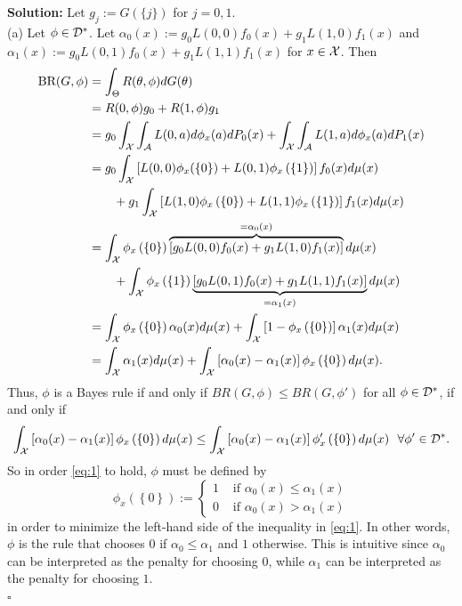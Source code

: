 \documentclass[12pt]{article}
\newcounter{ProofCounter}
\newenvironment{Solution}{\stepcounter{ProofCounter}\textbf{Solution:}}{\hfill$\square$}
\begin{document}
\begin{Solution}
  Let $g_j := G(\{j\})$ for $j = 0,1$. \\

  (a) Let $\phi \in \mathcal{D}^*$. Let $\alpha_0(x) := g_0L(0,0)f_0(x) + g_1L(1,0)f_1(x)$ and $\alpha_1(x) := g_0L(0,1)f_0(x) + g_1L(1,1)f_1(x)$
  for $x \in \mathcal{X}$.
  Then 
  \begin{align*}
    \text{BR}(G,\phi) & = \int_{\Theta}R(\theta, \phi)dG(\theta) \\
    & = R(0,\phi) g_0 + R(1,\phi)g_1 \\
    & = g_0 \int_{\mathcal{X}}\int_{\mathcal{A}}L(0,a)d\phi_x(a)dP_0(x) + \int_{\mathcal{X}}\int_{\mathcal{A}}L(1,a)d\phi_x(a)dP_1(x) \\
    & = g_0 \int_{\mathcal{X}}\left[ L(0,0)\phi_x(\left\{ 0 \right\}) + L(0,1)\phi_x\left( \left\{ 1 \right\} \right) \right]f_0(x)d\mu(x) \\
    & \qquad + 
    g_1\int_{\mathcal{X}}\left[ L(1,0)\phi_x\left( \left\{ 0 \right\} \right) + L(1,1)\phi_x\left( \left\{ 1 \right\} \right) \right]f_1(x)d\mu(x) \\
    & = \int_{\mathcal{X}}\phi_x\left( \left\{ 0 \right\} \right)\overbrace{\left[ g_0L(0,0)f_0(x) + g_1L(1,0)f_1(x) \right]}^{= \alpha_0(x)}d\mu(x) \\
    & \qquad + \int_{\mathcal{X}}\phi_x\left( \left\{ 1 \right\} \right)\underbrace{\left[ g_0L(0,1)f_0(x) + g_1L(1,1)f_1(x) \right]}_{=\alpha_1(x)}d\mu(x) \\
    & = \int_{\mathcal{X}}\phi_x\left( \left\{ 0 \right\} \right)\alpha_0(x)d\mu(x) + \int_{\mathcal{X}}\left[ 1 - \phi_x\left( \left\{ 0 \right\} \right)
    \right]\alpha_1(x)d\mu(x) \\
    & = \int_{\mathcal{X}}\alpha_1(x)d\mu(x) + \int_{\mathcal{X}}\left[ \alpha_0(x) - \alpha_1(x) \right]\phi_x\left( \left\{ 0 \right\} \right)d\mu(x).
  \end{align*}
  Thus, $\phi$ is a Bayes rule if and only if $BR(G,\phi) \leq BR(G,\phi')$ for all $\phi \in \mathcal{D}^*$, if and only if 
  \begin{equation}
    \int_{\mathcal{X}}\left[ \alpha_0(x) - \alpha_1(x) \right]\phi_x\left( \left\{ 0 \right\} \right)d\mu(x) \leq \int_{\mathcal{X}}\left[ \alpha_0(x) - \alpha_1(x)
    \right]\phi_x'\left( \left\{ 0 \right\} \right)d\mu(x) \ \ \forall \phi' \in \mathcal{D}^*.
    \label{eq:1}
  \end{equation}
  So in order \eqref{eq:1} to hold, $\phi$ must be defined by 
  \[
    \phi_x\left( \left\{ 0 \right\} \right) := \left\{ \begin{array}{cl}
        1 & \text{ if } \alpha_0(x) \leq \alpha_1(x) \\
        0 & \text{ if } \alpha_0(x) > \alpha_1(x) 
    \end{array} \right. 
  \]
  in order to minimize the left-hand side of the inequality in \eqref{eq:1}. In other words, $\phi$ is the rule that chooses $0$ if $\alpha_0 \leq
  \alpha_1$ and $1$ otherwise. This is intuitive since $\alpha_0$ can be interpreted as the penalty for choosing $0$, while $\alpha_1$ can be
  interpreted as the penalty for choosing $1$. \\


\end{Solution}
\end{document}
